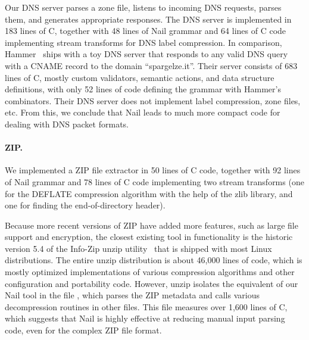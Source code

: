 Our DNS server parses a zone file, listens to incoming DNS requests,
parses them, and generates appropriate responses.  The DNS server is
implemented in 183 lines of C, together with 48 lines of Nail grammar
and 64 lines of C code implementing stream transforms for DNS label
compression.  In comparison, Hammer~\cite{hammer-parser} ships with a toy
DNS server that responds to any valid DNS query with a CNAME record to the
domain ``spargelze.it''.  Their server consists of 683 lines of C, mostly
custom validators, semantic actions, and data structure definitions, with
only 52 lines of code defining the grammar with Hammer's combinators.
Their DNS server does not implement label compression, zone files, etc.
From this, we conclude that Nail leads to much more compact code for
dealing with DNS packet formats.


\paragraph{ZIP.}

We implemented a ZIP file extractor in 50 lines of C code, together with
92 lines of Nail grammar and 78 lines of C code implementing two stream
transforms (one for the DEFLATE compression algorithm with the help of
the zlib library, and one for finding the end-of-directory header).

Because more recent versions of ZIP have added more features, such
as large file support and encryption, the closest existing tool
in functionality is the historic version 5.4 of the Info-Zip unzip
utility~\cite{infozip} that is shipped with most Linux distributions.
The entire unzip distribution is about 46,000 lines of code, which is
mostly optimized implementations of various compression algorithms and
other configuration and portability code.  However, unzip isolates the
equivalent of our Nail tool in the file , which parses the
ZIP metadata and calls various decompression routines in other files. This
file measures over 1,600 lines of C, which suggests that Nail is highly
effective at reducing manual input parsing code, even for the complex
ZIP file format.

